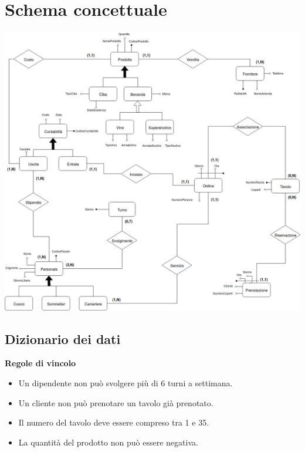 \section{Schema concettuale} %
\includegraphics[width=1\textwidth]{doc/schema}
\subsection{Dizionario dei dati}
\textbf{Regole di vincolo} 
\begin{itemize}
    \item Un dipendente non può svolgere più di 6 turni a settimana.
    \item Un cliente non può prenotare un tavolo già prenotato.
    \item Il numero del tavolo deve essere compreso tra 1 e 35.
    \item La quantità del prodotto non può essere negativa.
\end{itemize}

